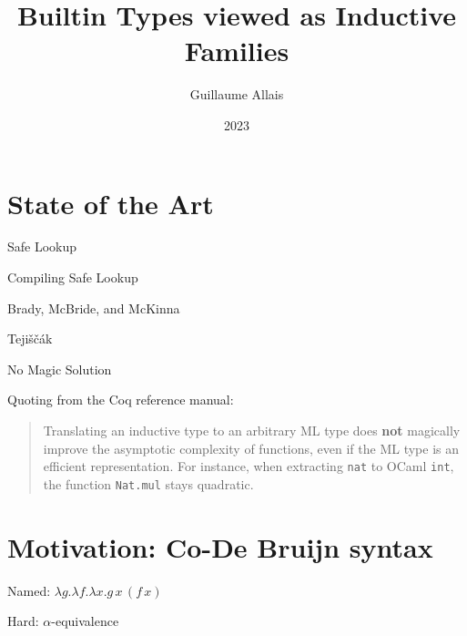 \documentclass{beamer}
\title{Builtin Types viewed as Inductive Families}
\author{Guillaume Allais}
\institute{University of Strathclyde \\ Glasgow, UK}
\date{2023}
\begin{document}
\begin{frame}
  \maketitle
\end{frame}

\section{State of the Art}

\begin{frame}{Safe Lookup}


\end{frame}

\begin{frame}{Compiling Safe Lookup}

Brady, McBride, and McKinna~\cite{DBLP:conf/types/BradyMM03}


Tejiščák~\cite{DBLP:journals/pacmpl/Tejiscak20}

\end{frame}

\begin{frame}{No Magic Solution}

Quoting from the Coq reference manual:\bigskip

\begin{quote}
Translating an inductive type to an arbitrary ML type
does \textbf{not} magically improve the asymptotic complexity of
functions, even if the ML type is an efficient representation.
For instance, when extracting \texttt{nat} to OCaml \texttt{int}, the
function \texttt{Nat.mul} stays quadratic.
\end{quote}
\end{frame}

\section{Motivation: Co-De Bruijn syntax}

\begin{frame}{Named: $\lambda{}g.\lambda{}f.\lambda{}x.g\,x\,(f\,x)$}


\vfill
Hard: $\alpha$-equivalence
\end{frame}
\end{document}

